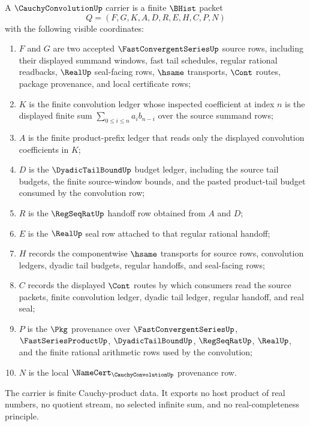 \begin{definition}
\label{def:cauchy-convolution-carrier}
A $\CauchyConvolutionUp$ carrier is a finite $\BHist$ packet
$$
Q=(F,G,K,A,D,R,E,H,C,P,N)
$$
with the following visible coordinates:
\begin{enumerate}
\item $F$ and $G$ are two accepted $\FastConvergentSeriesUp$ source rows, including their displayed summand windows, fast tail schedules, regular rational readbacks, $\RealUp$ seal-facing rows, $\hsame$ transports, $\Cont$ routes, package provenance, and local certificate rows;
\item $K$ is the finite convolution ledger whose inspected coefficient at index $n$ is the displayed finite sum $\sum_{0 \leq i \leq n} a_i b_{n-i}$ over the source summand rows;
\item $A$ is the finite product-prefix ledger that reads only the displayed convolution coefficients in $K$;
\item $D$ is the $\DyadicTailBoundUp$ budget ledger, including the source tail budgets, the finite source-window bounds, and the pasted product-tail budget consumed by the convolution row;
\item $R$ is the $\RegSeqRatUp$ handoff row obtained from $A$ and $D$;
\item $E$ is the $\RealUp$ seal row attached to that regular rational handoff;
\item $H$ records the componentwise $\hsame$ transports for source rows, convolution ledgers, dyadic tail budgets, regular handoffs, and seal-facing rows;
\item $C$ records the displayed $\Cont$ routes by which consumers read the source packets, finite convolution ledger, dyadic tail ledger, regular handoff, and real seal;
\item $P$ is the $\Pkg$ provenance over $\FastConvergentSeriesUp$, $\FastSeriesProductUp$, $\DyadicTailBoundUp$, $\RegSeqRatUp$, $\RealUp$, and the finite rational arithmetic rows used by the convolution;
\item $N$ is the local $\NameCert_{\CauchyConvolutionUp}$ provenance row.
\end{enumerate}
The carrier is finite Cauchy-product data. It exports no host product of real numbers, no quotient stream, no selected infinite sum, and no real-completeness principle.
\end{definition}

